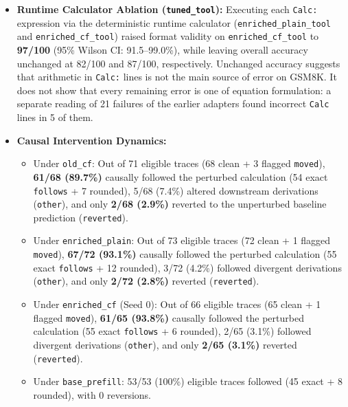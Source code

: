 \documentclass[11pt,a4paper]{article}
\begin{document}
\begin{itemize}
    \item \textbf{Runtime Calculator Ablation (\texttt{tuned\_tool}):} Executing each \texttt{Calc:} expression via the deterministic runtime calculator (\texttt{enriched\_plain\_tool} and \texttt{enriched\_cf\_tool}) raised format validity on \texttt{enriched\_cf\_tool} to \textbf{97/100} (95\% Wilson CI: 91.5--99.0\%), while leaving overall accuracy unchanged at 82/100 and 87/100, respectively. Unchanged accuracy suggests that arithmetic in \texttt{Calc:} lines is not the main source of error on GSM8K. It does not show that every remaining error is one of equation formulation: a separate reading of 21 failures of the earlier adapters found incorrect \texttt{Calc} lines in 5 of them.
    
    \item \textbf{Causal Intervention Dynamics:}
    \begin{itemize}
        \item Under \texttt{old\_cf}: Out of 71 eligible traces (68 clean + 3 flagged \texttt{moved}), \textbf{61/68 (89.7\%)} causally followed the perturbed calculation (54 exact \texttt{follows} + 7 rounded), 5/68 (7.4\%) altered downstream derivations (\texttt{other}), and only \textbf{2/68 (2.9\%)} reverted to the unperturbed baseline prediction (\texttt{reverted}).
        \item Under \texttt{enriched\_plain}: Out of 73 eligible traces (72 clean + 1 flagged \texttt{moved}), \textbf{67/72 (93.1\%)} causally followed the perturbed calculation (55 exact \texttt{follows} + 12 rounded), 3/72 (4.2\%) followed divergent derivations (\texttt{other}), and only \textbf{2/72 (2.8\%)} reverted (\texttt{reverted}).
        \item Under \texttt{enriched\_cf} (Seed 0): Out of 66 eligible traces (65 clean + 1 flagged \texttt{moved}), \textbf{61/65 (93.8\%)} causally followed the perturbed calculation (55 exact \texttt{follows} + 6 rounded), 2/65 (3.1\%) followed divergent derivations (\texttt{other}), and only \textbf{2/65 (3.1\%)} reverted (\texttt{reverted}).
        \item Under \texttt{base\_prefill}: 53/53 (100\%) eligible traces followed (45 exact + 8 rounded), with 0 reversions.
    \end{itemize}
    

\end{itemize}
\end{document}
